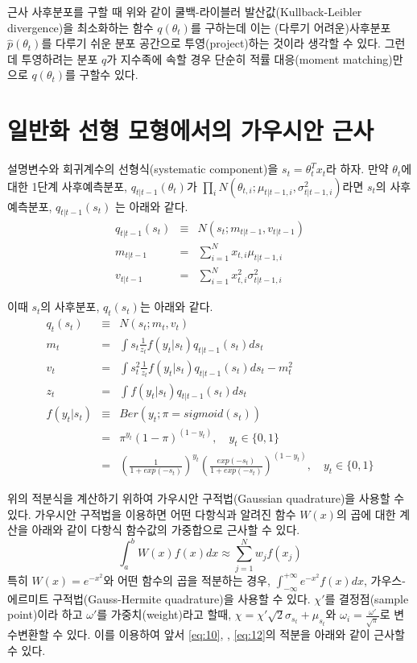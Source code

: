 \documentclass[oneside,b5paper,11pt]{book} %
\begin{document}
근사 사후분포를 구할 때 위와 같이 쿨백-라이블러 발산값(Kullback-Leibler divergence)을 최소화하는 함수 $q(\theta_t)$를 구하는데 이는 (다루기 어려운)사후분포$\hat{p}(\theta_t)$를 다루기 쉬운 분포 공간으로 투영(project)하는 것이라 생각할 수 있다. 그런데 투영하려는 분포 $q$가 지수족에 속할 경우 단순히 적률 대응(moment matching)만으로 $q(\theta_t)$를 구할수 있다.\citep{Murphy2012}


\section{일반화 선형 모형에서의 가우시안 근사}
설명변수와 회귀계수의 선형식(systematic component)을 $s_t=\theta_t^T x_t$라 하자. 만약 $\theta_t$에 대한 1단계 사후예측분포, $q_{t|t-1}(\theta_t)$가 $\prod_i N(\theta_{t,i};\mu_{t|t-1,i},\sigma^2_{t|t-1,i})$라면 $s_t$의 사후 예측분포, $q_{t|t-1}(s_t)$ 는 아래와 같다.
\begin{eqnarray}
   q_{t|t-1}(s_{t}) &\equiv& N(s_t;m_{t|t-1}, {v}_{t|t-1})
\\ m_{t|t-1} &=& \sum^N_{i=1}x_{t,i}\mu_{t|t-1,i}
\\ {v}_{t|t-1} &=& \sum^N_{i=1}x^2_{t,i}{\sigma}^2_{t|t-1,i}
\end{eqnarray}

이때 $s_t$의 사후분포, $q_t(s_t)$는 아래와 같다.
\begin{eqnarray}
q_t(s_t) &\equiv& N(s_t; m_t, v_t)
\\ m_t &=& \int s_t \frac{1}{z_t} f(y_t|s_t) q_{t|t-1}(s_t)ds_t \label{eq:10}
\\ v_t &=& \int s^2_t \frac{1}{z_t} f(y_t|s_t) q_{t|t-1}(s_t) ds_t - m_t^2 \label{eq:11}
\\ z_t &=& \int f(y_t|s_t) q_{t|t-1}(s_t)ds_t \label{eq:12}
\\ f(y_t|s_t) &\equiv& Ber(y_t;\pi = sigmoid(s_t))
\\ & =& \pi^{y_t} (1-\pi)^{(1-y_t)}, \quad y_t \in \{0,1\}
\\ & =& \left(\frac{1}{1+exp(-s_t)}\right)^{y_t} \left(\frac{exp(-s_t)}{1+exp(-s_t)}\right)^{(1-y_t)}, \quad y_t \in \{0,1\} \nonumber
\end{eqnarray}

위의 적분식을 계산하기 위하여 가우시안 구적법(Gaussian quadrature)을 사용할 수 있다. 가우시안 구적법을 이용하면 어떤 다항식과 알려진 함수 $W(x)$의 곱에 대한 계산을 아래와 같이 다항식 함수값의 가중합으로 근사할 수 있다.$$\int^b_a W(x)f(x)dx \approx \sum^N_{j=1}w_j f(x_j)$$
특히 $W(x)=e^{-x^2}$와 어떤 함수의 곱을 적분하는 경우, $\int^{+\infty}_{-\infty}e^{-x^2}f(x)dx$, 가우스-에르미트 구적법(Gauss-Hermite quadrature)을 사용할 수 있다. $\chi'$를 결정점(sample point)이라 하고 $\omega'$를 가중치(weight)라고 할때,  $\chi=\chi'\sqrt{2}\sigma_{s_t}+\mu_{s_t}$와 $\omega_i = \frac{\omega'}{\sqrt{\pi}}$로 변수변환할 수 있다. 이를 이용하여 앞서 \ref{eq:10}, \label{eq:11}, \ref{eq:12}의 적분을 아래와 같이 근사할 수 있다.\citep{Zoeter2007}
\end{document}
